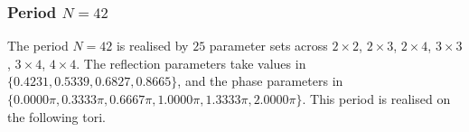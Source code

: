 \par
\subsubsection{Period $N = 42$}
The period $N=42$ is realised by $25$ parameter sets across $2\times2$, $2\times3$, $2\times4$, $3\times3$, $3\times4$, $4\times4$. The reflection parameters take values in $\{0.4231, 0.5339, 0.6827, 0.8665\}$, and the phase parameters in $\{0.0000\pi, 0.3333\pi, 0.6667\pi, 1.0000\pi, 1.3333\pi, 2.0000\pi\}$. This period is realised on the following tori.
